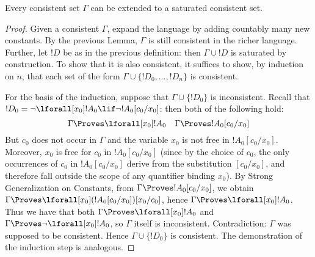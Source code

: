 \documentclass[../../include/open-logic-section]{subfiles}
\begin{document}
\begin{thm}
  Every consistent set $\Gamma$ can be extended to a saturated
  consistent set.
\end{thm}

\begin{proof}
Given a consistent $\Gamma$, expand the language by adding countably
many new constants. By the previous Lemma, $\Gamma$ is still
consistent in the richer language. Further, let $!D$ be as in the
previous definition: then $\Gamma \cup !D$ is saturated by
construction. To show that it is also consistent, it suffices to show,
by induction on $n$, that each set of the form $\Gamma \cup \{
!D_0, \dots, !D_n \}$ is consistent.

For the basis of the induction, suppose that $\Gamma \cup \{ !D_0
\}$ is inconsistent. Recall that $!D_0 = \lnot \lforall[x_0] !A_0
\lif \lnot !A_0 [c_0/x_0]$: then both of the following hold:
\[
\Gamma \Proves \lforall[x_0] !A_0
\quad
\Gamma \Proves !A_0[c_0/x_0]
\]
But $c_0$ does not occur in $\Gamma$ and the variable $x_0$ is not
free in $!A_0 [ c_0/x_0]$. Moreover, $x_0$ is free for $c_0$ in $!A_0
[c_0/x_0]$ (since by the choice of $c_0$, the only occurrences of
$c_0$ in $!A_0 [c_0/x_0]$ derive from the substitution $[c_0/x_0]$,
and therefore fall outside the scope of any quantifier binding
$x_0$). By Strong Generalization on Constants, from $\Gamma \Proves
!A_0 [c_0/x_0]$, we obtain $\Gamma \Proves \lforall[x_0] ( !A_0
[c_0/x_0] ) [x_0/c_0]$, hence $\Gamma \Proves \lforall[x_0]
!A_0$. Thus we have that both $\Gamma \Proves \lforall[x_0] !A_0$ and
$\Gamma \Proves \lnot \lforall[x_0] !A_0$, so $\Gamma$ itself is
inconsistent. Contradiction: $\Gamma$ was supposed to be
consistent. Hence $\Gamma \cup \{ !D_0\}$ is consistent. The
demonstration of the induction step is analogous.
\end{proof}
\end{document}
